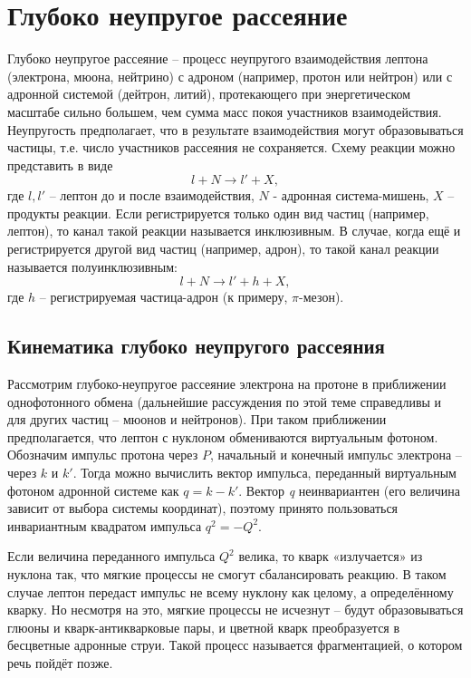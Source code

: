 \documentclass{extarticle}
\begin{document}
\section{Глубоко неупругое рассеяние}
Глубоко неупругое рассеяние – процесс неупругого взаимодействия лептона (электрона, мюона, нейтрино) с адроном (например, протон или нейтрон) или с адронной системой (дейтрон, литий), протекающего при энергетическом масштабе сильно большем, чем сумма масс покоя участников взаимодействия. Неупругость предполагает, что в результате взаимодействия могут образовываться частицы, т.е. число участников рассеяния не сохраняется. Схему реакции можно представить в виде
\begin{equation}
	l + N \rightarrow l' + X,
\end{equation}
где $l, l'$ -- лептон до и после взаимодействия, $N$ - адронная система-мишень, $X$ -- продукты реакции. Если регистрируется только один вид частиц (например, лептон), то канал такой реакции называется инклюзивным. В случае, когда ещё и регистрируется другой вид частиц (например, адрон), то такой канал реакции называется полуинклюзивным:
\begin{equation}
	l + N \rightarrow l' + h + X,
\end{equation}
где $h$ -- регистрируемая частица-адрон (к примеру, $\pi$-мезон). 
\subsection{Кинематика глубоко неупругого рассеяния}
Рассмотрим глубоко-неупругое рассеяние электрона на протоне в приближении однофотонного обмена (дальнейшие рассуждения по этой теме справедливы и для других частиц – мюонов и нейтронов). При таком приближении предполагается, что лептон с нуклоном обмениваются виртуальным фотоном. Обозначим импульс протона через $P$, начальный и конечный импульс электрона – через $k$ и $k'$. Тогда можно вычислить вектор импульса, переданный виртуальным фотоном адронной системе как $q=k-k'$. Вектор \textit{q} неинвариантен (его величина зависит от выбора системы координат), поэтому принято пользоваться инвариантным квадратом импульса $q^2=-Q^2$.

Если величина переданного импульса $Q^2$ велика, то кварк «излучается» из нуклона так, что мягкие процессы не смогут сбалансировать реакцию. В таком случае лептон передаст импульс не всему нуклону как целому, а определённому кварку. Но несмотря на это, мягкие процессы не исчезнут – будут образовываться глюоны и кварк-антикварковые пары, и цветной кварк преобразуется в бесцветные адронные струи. Такой процесс называется фрагментацией, о котором речь пойдёт позже.
\end{document}
